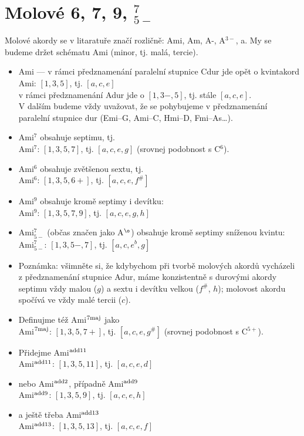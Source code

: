 \documentclass[12pt]{article}
\begin{document}
\section{Molové 6, 7, 9, ${}^{7}_{5-}$}

Molové akordy se v litaratuře značí rozličně: Ami, Am, A-, A${}^{3-}$, a. My se budeme držet schématu Ami (minor, tj. malá, tercie).

\begin{itemize}
  \item Ami --- v rámci předznamenání paralelní stupnice Cdur jde opět o kvintakord 
 \\ Ami: $[1,3,5]$, tj. $[a,c,e]$
 \\ v rámci předznamenání Adur jde o $[1,3-,5]$, tj. stále $[a,c,e]$.
 \\ V dalším budeme vždy uvažovat, že se pohybujeme v předznamenání paralelní stupnice dur (Emi--G, Ami--C, Hmi--D, Fmi--As\ldots).
  \item Ami${}^{7}$ obsahuje septimu, tj.
   \\ Ami${}^{7}$: $[1,3,5,7]$, tj. $[a,c,e,g]$ (srovnej podobnost s C${}^6$).
  \item Ami${}^{6}$ obsahuje zvětšenou sextu, tj.
   \\ Ami${}^{6}$: $[1,3,5,6+]$, tj. $[a,c,e,f^\#]$
  \item Ami${}^{9}$ obsahuje kromě septimy i devítku:
   \\ Ami${}^{9}$: $[1,3,5,7,9]$, tj. $[a,c,e,g,h]$
  \item Ami${}^{7}_{5-}$ (občas značen jako A${}^{\o}$) obsahuje kromě septimy sníženou kvintu:
   \\ Ami${}^{7}_{5-}$: $[1,3,5-,7]$, tj. $[a,c,e^b,g]$
  \item Poznámka: všimněte si, že kdybychom při tvorbě molových akordů vycházeli z předznamenání stupnice Adur, máme konzistentně s durovými akordy septimu vždy malou ($g$) a sextu i devítku velkou ($f^\#$, $h$); molovost akordu spočívá ve vždy malé tercii ($c$).

  \item Definujme též Ami${}^{\rm 7maj}$ jako
   \\ Ami${}^{\rm 7maj}$: $[1,3,5,7+]$, tj. $[a,c,e,g^\#]$ (srovnej podobnost s C${}^{5+}$).


  \item Přidejme Ami${}^{\rm add11}$
   \\ Ami${}^{\rm add11}$: $[1,3,5,11]$, tj. $[a,c,e,d]$
  \item nebo Ami${}^{\rm add2}$, případně Ami${}^{\rm add9}$
   \\ Ami${}^{\rm add9}$: $[1,3,5,9]$, tj. $[a,c,e,h]$
  \item a ještě třeba Ami${}^{\rm add13}$
   \\ Ami${}^{\rm add13}$: $[1,3,5,13]$, tj. $[a,c,e,f]$


\end{itemize}
\end{document}
